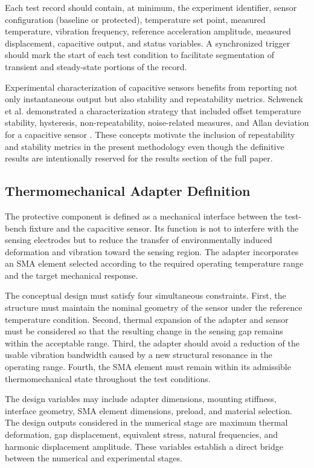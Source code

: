 \documentclass[conference]{IEEEtran}
\begin{document}
Each test record should contain, at minimum, the experiment identifier, sensor configuration (baseline or protected), temperature set point, measured temperature, vibration frequency, reference acceleration amplitude, measured displacement, capacitive output, and status variables. A synchronized trigger should mark the start of each test condition to facilitate segmentation of transient and steady-state portions of the record.

Experimental characterization of capacitive sensors benefits from reporting not only instantaneous output but also stability and repeatability metrics. Schwenck et al. demonstrated a characterization strategy that included offset temperature stability, hysteresis, non-repeatability, noise-related measures, and Allan deviation for a capacitive sensor \cite{Schwenck2021}. These concepts motivate the inclusion of repeatability and stability metrics in the present methodology even though the definitive results are intentionally reserved for the results section of the full paper.

\subsection{Thermomechanical Adapter Definition}

The protective component is defined as a mechanical interface between the test-bench fixture and the capacitive sensor. Its function is not to interfere with the sensing electrodes but to reduce the transfer of environmentally induced deformation and vibration toward the sensing region. The adapter incorporates an SMA element selected according to the required operating temperature range and the target mechanical response.

The conceptual design must satisfy four simultaneous constraints. First, the structure must maintain the nominal geometry of the sensor under the reference temperature condition. Second, thermal expansion of the adapter and sensor must be considered so that the resulting change in the sensing gap remains within the acceptable range. Third, the adapter should avoid a reduction of the usable vibration bandwidth caused by a new structural resonance in the operating range. Fourth, the SMA element must remain within its admissible thermomechanical state throughout the test conditions.

The design variables may include adapter dimensions, mounting stiffness, interface geometry, SMA element dimensions, preload, and material selection. The design outputs considered in the numerical stage are maximum thermal deformation, gap displacement, equivalent stress, natural frequencies, and harmonic displacement amplitude. These variables establish a direct bridge between the numerical and experimental stages.
\end{document}
